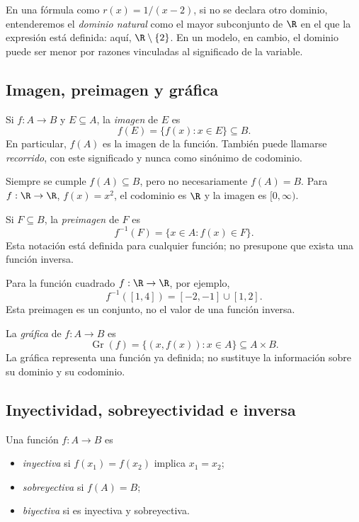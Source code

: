 En una fórmula como \(r(x)=1/(x-2)\), si no se declara otro dominio,
entenderemos el \emph{dominio natural} como el mayor subconjunto de \(\R\) en
el que la expresión está definida: aquí, \(\R\setminus\{2\}\). En un modelo,
en cambio, el dominio puede ser menor por razones vinculadas al significado de
la variable.

\subsection{Imagen, preimagen y gráfica}

\begin{definicion}[Imagen]
Si \(f:A\to B\) y \(E\subseteq A\), la \emph{imagen} de \(E\) es
\[
  f(E)=\{f(x):x\in E\}\subseteq B.
\]
En particular, \(f(A)\) es la imagen de la función. También puede llamarse
\emph{recorrido}, con este significado y nunca como sinónimo de codominio.
\end{definicion}

Siempre se cumple \(f(A)\subseteq B\), pero no necesariamente
\(f(A)=B\). Para \(f:\R\to\R\), \(f(x)=x^2\), el codominio es \(\R\) y la
imagen es \([0,\infty)\).

\begin{definicion}[Preimagen]
Si \(F\subseteq B\), la \emph{preimagen} de \(F\) es
\[
  f^{-1}(F)=\{x\in A:f(x)\in F\}.
\]
Esta notación está definida para cualquier función; no presupone que exista una
función inversa.
\end{definicion}

Para la función cuadrado \(f:\R\to\R\), por ejemplo,
\[
  f^{-1}([1,4])=[-2,-1]\cup[1,2].
\]
Esta preimagen es un conjunto, no el valor de una función inversa.

La \emph{gráfica} de \(f:A\to B\) es
\[
  \operatorname{Gr}(f)=\{(x,f(x)):x\in A\}\subseteq A\times B.
\]
La gráfica representa una función ya definida; no sustituye la información
sobre su dominio y su codominio.

\subsection{Inyectividad, sobreyectividad e inversa}

Una función \(f:A\to B\) es
\begin{itemize}
  \item \emph{inyectiva} si \(f(x_1)=f(x_2)\) implica \(x_1=x_2\);
  \item \emph{sobreyectiva} si \(f(A)=B\);
  \item \emph{biyectiva} si es inyectiva y sobreyectiva.
\end{itemize}

